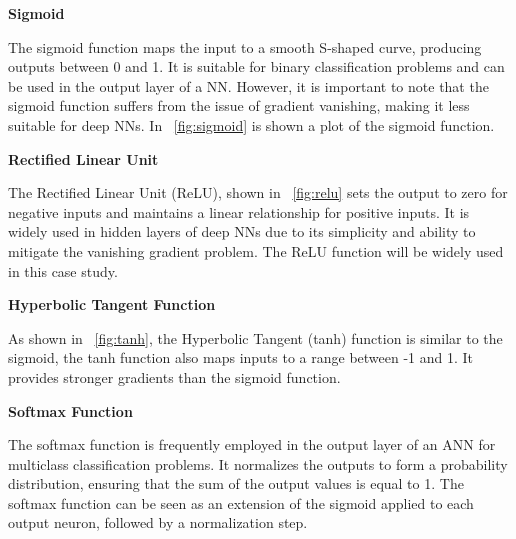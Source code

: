 \vspace{0.2cm}
\textbf{Sigmoid}

The sigmoid function maps the input to a smooth S-shaped curve, producing outputs between 0 and 1. It is suitable for binary classification problems and can be used in the output layer of a NN. However, it is important to note that the sigmoid function suffers from the issue of gradient vanishing, making it less suitable for deep NNs. In \Fig~\ref{fig:sigmoid} is shown a plot of the sigmoid function.

\vspace{0.2cm}
\textbf{Rectified Linear Unit}

The Rectified Linear Unit (ReLU), shown in \Fig~\ref{fig:relu} sets the output to zero for negative inputs and maintains a linear relationship for positive inputs. It is widely used in hidden layers of deep NNs due to its simplicity and ability to mitigate the vanishing gradient problem. The ReLU function will be widely used in this case study.

\vspace{0.2cm}
\textbf{Hyperbolic Tangent Function}

As shown in \Fig~\ref{fig:tanh}, the Hyperbolic Tangent (tanh) function is similar to the sigmoid, the tanh function also maps inputs to a range between -1 and 1. It provides stronger gradients than the sigmoid function.

\vspace{0.2cm}
\textbf{Softmax Function}

The softmax function is frequently employed in the output layer of an ANN for multiclass classification problems. It normalizes the outputs to form a probability distribution, ensuring that the sum of the output values is equal to 1. The softmax function can be seen as an extension of the sigmoid applied to each output neuron, followed by a normalization step.

